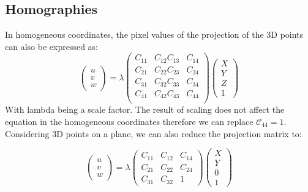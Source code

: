 \documentclass{article}
\begin{document}
\subsection{Homographies}
In homogeneous coordinates, the pixel values of the projection of the 3D points can also be expressed as:
\begin{equation}
    \begin{pmatrix} u \\ v \\ w \end{pmatrix} = \lambda\begin{pmatrix} C_{11} & C_{12} C_{13} & C_{14} \\ C_{21} & C_{22} C_{23} & C_{24} \\ C_{31} & C_{32} C_{33} & C_{34} \\ C_{41} & C_{42} C_{43} & C_{44} \\  \end{pmatrix} \begin{pmatrix}
    X \\ Y \\ Z \\ 1
    \end{pmatrix}
\end{equation}
With lambda being a scale factor. The result of scaling does not affect the equation in the homogeneous coordinates therefore we can replace $\mathcal{C_{44} = 1}$.
Considering 3D points on a plane, we can also reduce the projection matrix to:

\begin{equation}
    \begin{pmatrix} u \\ v \\ w \end{pmatrix} = \lambda\begin{pmatrix} C_{11} & C_{12}  & C_{14} \\ C_{21} & C_{22}  & C_{24} \\ C_{31} & C_{32}  & 1  \end{pmatrix} \begin{pmatrix}
    X \\ Y \\ 0 \\ 1
    \end{pmatrix}
\end{equation}
\end{document}
